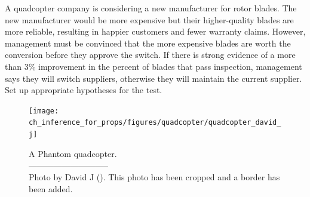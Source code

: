 \begin{exercisewrap}
\begin{nexercise}\label{carWheelBladeManufacturer}
A quadcopter company is considering a new manufacturer for rotor blades. The new manufacturer would be more expensive but their higher-quality blades are more reliable, resulting in happier customers and fewer warranty claims. However, management must be convinced that the more expensive blades are worth the conversion before they approve the switch. If there is strong evidence of a more than 3\% improvement in the percent of blades that pass inspection, management says they will switch suppliers, otherwise they will maintain the current supplier. Set up appropriate hypotheses for the test.\footnotemark
\end{nexercise}
\end{exercisewrap}

\setlength{\captionwidth}{85mm}

\begin{figure}
\centering
\texttt{[image: ch\_inference\_for\_props/figures/quadcopter/quadcopter\_david\_j]}
\caption{A Phantom quadcopter.\vspace{-1mm} \\
   -----------------------------\vspace{-2mm}\\
   {\footnotesize Photo by David J ().  This photo has been cropped and a border has been added.}}
\label{quadcopter_david_j}
\end{figure}

\setlength{\captionwidth}{\mycaptionwidth}


